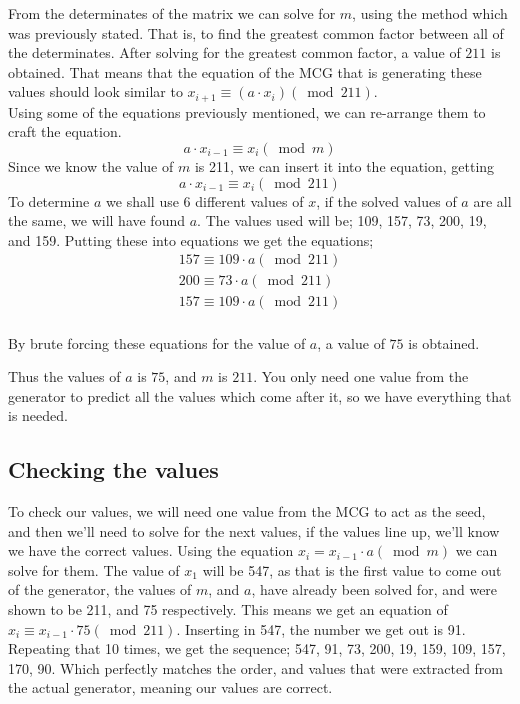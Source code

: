 \documentclass[12pft, english]{article}
\begin{document}
\begin{multicols}{2}
  From the determinates of the matrix we can solve for \(m\), using the method which was previously stated. That is, to find the greatest common factor between all of the determinates. After solving for the greatest common factor, a value of \(211\) is obtained. That means that the equation of the MCG that is generating these values should look similar to \(x_{i+1} \equiv (a \cdot x_{i}) (\bmod {211})\). \\
  Using some of the equations previously mentioned, we can re-arrange them to craft the equation. \cite{reteamHal}
  \[ a \cdot x_{i - 1} \equiv x_{i} ( \bmod m )\]
  Since we know the value of \(m\) is 211, we can insert it into the equation, getting
  \[a \cdot x_{i-1} \equiv x_{i} (\bmod 211)\]
  To determine \(a\) we shall use 6 different values of \(x\), if the solved values of \(a\) are all the same, we will have found \(a\). The values used will be; 109, 157, 73, 200, 19, and 159. Putting these into equations we get the equations;
  \begin{gather*}
      157 \equiv 109 \cdot a (\bmod 211) \\
      200 \equiv 73 \cdot a (\bmod 211)  \\
      157 \equiv 109 \cdot a (\bmod 211) \\
    \end{gather*}

    By brute forcing these equations for the value of \(a\), a value of \(75\) is obtained.

    Thus the values of \(a\) is \(75\), and \(m\) is \(211\). You only need one value from the generator to predict all the values which come after it, so we have everything that is needed.

    \subsection{Checking the values}
    To check our values, we will need one value from the MCG to act as the seed, and then we'll need to solve for the next values, if the values line up, we'll know we have the correct values. Using the equation \(x_{i} = x_{i-1} \cdot a (\bmod m)\) we can solve for them. The value of \(x_{1}\) will be 547, as that is the first value to come out of the generator, the values of \(m\), and \(a\), have already been solved for, and were shown to be 211, and 75 respectively. This means we get an equation of \( x_{i} \equiv x_{i-1} \cdot 75 (\bmod 211)\). Inserting in 547, the number we get out is 91. Repeating that 10 times, we get the sequence; 547, 91, 73, 200, 19, 159, 109, 157, 170, 90. Which perfectly matches the order, and values that were extracted from the actual generator, meaning our values are correct.

\end{multicols}
\end{document}
